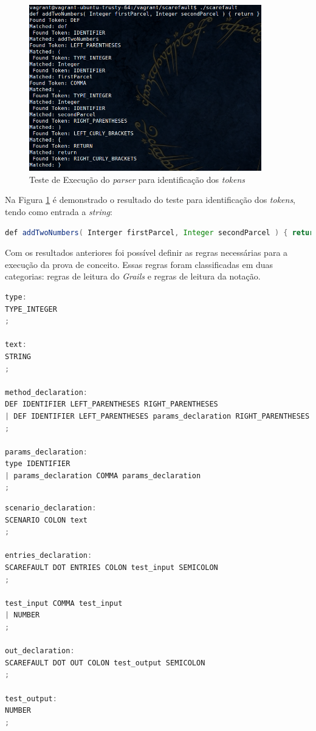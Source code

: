  \begin{figure}[h]
    \centering
    \includegraphics[width=0.9\textwidth]{figuras/second-test-grammar.png}
    \caption{Teste de Execução do \textit{parser} para identificação dos \textit{tokens}}
    \label{fig:test-tokens}
 \end{figure}
\par
\indent Na Figura \ref{fig:test-tokens} é demonstrado o resultado do teste para identificação dos \textit{tokens}, tendo como entrada a \textit{string}:
\par
\begin{lstlisting}[language=java, label=string-entry, caption=\textit{string} de entrada]
def addTwoNumbers( Interger firstParcel, Integer secondParcel ) { return }
\end{lstlisting}
\par
\indent Com os resultados anteriores foi possível definir as regras necessárias para a execução da prova de conceito. Essas regras foram classificadas em duas categorias: regras de leitura do \textit{Grails} e regras de leitura da notação.
\par
\begin{lstlisting}[language=C++, label=rules-grails, caption=Regras de Leitura do \textit{Grails}]
type:
TYPE_INTEGER
;

text:
STRING
;

method_declaration:
DEF IDENTIFIER LEFT_PARENTHESES RIGHT_PARENTHESES
| DEF IDENTIFIER LEFT_PARENTHESES params_declaration RIGHT_PARENTHESES
;

params_declaration:
type IDENTIFIER
| params_declaration COMMA params_declaration
;
\end{lstlisting}
\par 
\begin{lstlisting}[language=C++, label=rules-scarefault, caption=Regras de Leitura da notação]
scenario_declaration:
SCENARIO COLON text
;

entries_declaration:
SCAREFAULT DOT ENTRIES COLON test_input SEMICOLON
;

test_input COMMA test_input
| NUMBER
;

out_declaration:
SCAREFAULT DOT OUT COLON test_output SEMICOLON
;

test_output:
NUMBER
;
\end{lstlisting}
